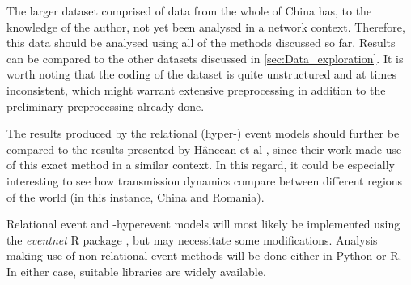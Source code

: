 \documentclass{article}
\begin{document}
	The larger dataset comprised of data from the whole of China has, to the knowledge of the author, not yet been analysed in a network context. Therefore, this data should be analysed using all of the methods discussed so far. Results can be compared to the other datasets discussed in \ref{sec:Data_exploration}. It is worth noting that the coding of the dataset is quite unstructured and at times inconsistent, which might warrant extensive preprocessing in addition to the preliminary preprocessing already done.
	
	The results produced by the relational (hyper-) event models should further be compared to the results presented by Hâncean et al \cite{hancean2022occupations}, since their work made use of this exact method in a similar context. In this regard, it could be especially interesting to see how transmission dynamics compare between different regions of the world (in this instance, China and Romania). 
	
	Relational event and -hyperevent models will most likely be implemented using the \emph{eventnet} R package \cite{eventnet}, but may necessitate some modifications. Analysis making use of non relational-event methods will be done either in Python or R. In either case, suitable libraries are widely available.
	
	\printbibliography
\end{document}
